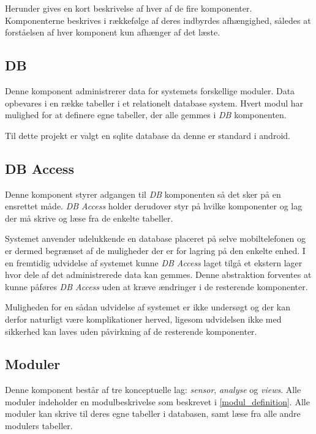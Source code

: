 Herunder gives en kort beskrivelse af hver af de fire komponenter.
Komponenterne beskrives i rækkefølge af deres indbyrdes afhængighed, således at forståelsen af hver komponent kun afhænger af det læste.

\subsection*{DB}
Denne komponent administrerer data for systemets forskellige moduler.
Data opbevares i en række tabeller i et relationelt database system.
Hvert modul har mulighed for at definere egne tabeller, der alle gemmes i \textit{DB} komponenten.

Til dette projekt er valgt en sqlite database da denne er standard i android.

\subsection*{DB Access}
Denne komponent styrer adgangen til \textit{DB} komponenten så det sker på en ensrettet måde.
\textit{DB Access} holder derudover styr på hvilke komponenter og lag der må skrive og læse fra de enkelte tabeller.

Systemet anvender udelukkende en database placeret på selve mobiltelefonen og er dermed begrænset af de muligheder der er for lagring på den enkelte enhed.
I en fremtidig udvidelse af systemet kunne \textit{DB Access} laget tilgå et ekstern lager hvor dele af det administrerede data kan gemmes.
Denne abstraktion forventes at kunne påføres \textit{DB Access} uden at kræve ændringer i de resterende komponenter.

Muligheden for en sådan udvidelse af systemet er ikke undersøgt og der kan derfor naturligt være komplikationer herved, ligesom udvidelsen ikke med sikkerhed kan laves uden påvirkning af de resterende komponenter.

\subsection*{Moduler}
Denne komponent består af tre konceptuelle lag: \textit{sensor}, \textit{analyse} og \textit{views}.
Alle moduler indeholder en modulbeskrivelse som beskrevet i \cref{modul_definition}. 
Alle moduler kan skrive til deres egne tabeller i databasen, samt læse fra alle andre modulers tabeller.

